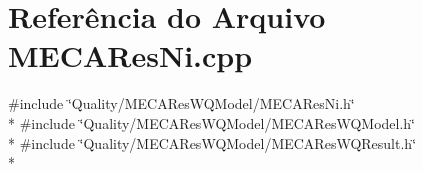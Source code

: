\section{Referência do Arquivo M\+E\+C\+A\+Res\+Ni.\+cpp}
\label{_m_e_c_a_res_ni_8cpp}
{\ttfamily \#include \char`\"{}Quality/\+M\+E\+C\+A\+Res\+W\+Q\+Model/\+M\+E\+C\+A\+Res\+Ni.\+h\char`\"{}}\\*
{\ttfamily \#include \char`\"{}Quality/\+M\+E\+C\+A\+Res\+W\+Q\+Model/\+M\+E\+C\+A\+Res\+W\+Q\+Model.\+h\char`\"{}}\\*
{\ttfamily \#include \char`\"{}Quality/\+M\+E\+C\+A\+Res\+W\+Q\+Model/\+M\+E\+C\+A\+Res\+W\+Q\+Result.\+h\char`\"{}}\\*
